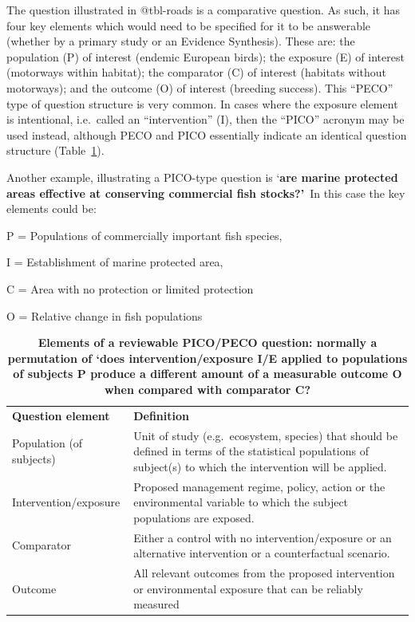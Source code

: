 \documentclass[
  letterpaper,
  DIV=11,
  numbers=noendperiod]{scrreprt}
\begin{document}
The question illustrated in @tbl-roads is a comparative question. As
such, it has four key elements which would need to be specified for it
to be answerable (whether by a primary study or an Evidence Synthesis).
These are: the population (P) of interest (endemic European birds); the
exposure (E) of interest (motorways within habitat); the comparator (C)
of interest (habitats without motorways); and the outcome (O) of
interest (breeding success). This ``PECO'' type of question structure is
very common. In cases where the exposure element is intentional,
i.e.~called an ``intervention'' (I), then the ``PICO'' acronym may be
used instead, although PECO and PICO essentially indicate an identical
question structure (Table~\ref{tbl-peco}).

Another example, illustrating a PICO-type question is `\textbf{are
marine protected areas effective at conserving commercial fish
stocks?'}~In this case the key elements could be:

P = Populations of commercially important fish species,

I = Establishment of marine protected area,

C = Area with no protection or limited protection

O = Relative change in fish populations

\begin{longtable}[]{@{}
  >{\raggedright\arraybackslash}p{}
  >{\raggedright\arraybackslash}p{}@{}}
\caption{\textbf{Elements of a reviewable PICO/PECO question: normally a
permutation of `does intervention/exposure I/E applied to populations of
subjects P produce a different amount of a measurable outcome O when
compared with comparator C?}}\label{tbl-peco}\tabularnewline
\toprule\noalign{}
\endfirsthead
\endhead
\bottomrule\noalign{}
\endlastfoot
\textbf{Question element} & \textbf{Definition} \\
Population (of subjects) & Unit of study (e.g.~ecosystem, species) that
should be defined in terms of the statistical populations of subject(s)
to which the intervention will be applied. \\
Intervention/exposure & Proposed management regime, policy, action or
the environmental variable to which the subject populations are
exposed. \\
Comparator & Either a control with no intervention/exposure or an
alternative intervention or a counterfactual scenario. \\
Outcome & All relevant outcomes from the proposed intervention or
environmental exposure that can be reliably measured \\
\end{longtable}
\end{document}
